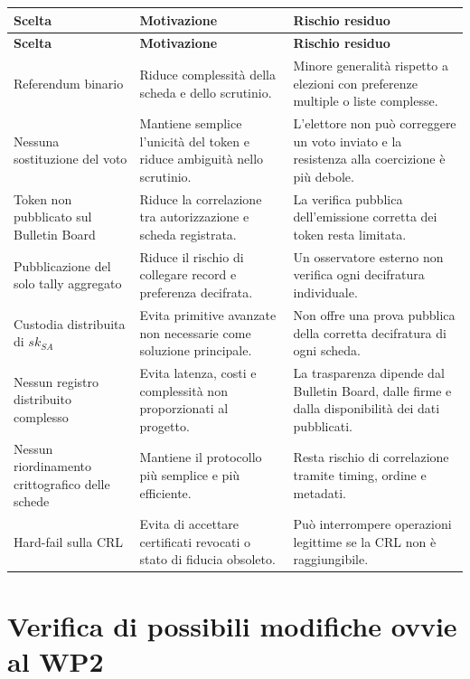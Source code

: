 \documentclass[a4paper,12pt]{article}
\begin{document}
\begin{longtable}{|>{\raggedright\arraybackslash}p{}|>{\raggedright\arraybackslash}p{}|>{\raggedright\arraybackslash}p{}|}
    \hline
    \rowcolor{HeaderBlue}\textbf{Scelta} & \textbf{Motivazione} & \textbf{Rischio residuo} \\
    \hline
    \endfirsthead
    \hline
    \rowcolor{HeaderBlue}\textbf{Scelta} & \textbf{Motivazione} & \textbf{Rischio residuo} \\
    \hline
    \endhead
    Referendum binario & Riduce complessità della scheda e dello scrutinio. & Minore generalità rispetto a elezioni con preferenze multiple o liste complesse. \\
    \hline
    Nessuna sostituzione del voto & Mantiene semplice l'unicità del token e riduce ambiguità nello scrutinio. & L'elettore non può correggere un voto inviato e la resistenza alla coercizione è più debole. \\
    \hline
    Token non pubblicato sul Bulletin Board & Riduce la correlazione tra autorizzazione e scheda registrata. & La verifica pubblica dell'emissione corretta dei token resta limitata. \\
    \hline
    Pubblicazione del solo tally aggregato & Riduce il rischio di collegare record e preferenza decifrata. & Un osservatore esterno non verifica ogni decifratura individuale. \\
    \hline
    Custodia distribuita di \(sk_{SA}\) & Evita primitive avanzate non necessarie come soluzione principale. & Non offre una prova pubblica della corretta decifratura di ogni scheda. \\
    \hline
    Nessun registro distribuito complesso & Evita latenza, costi e complessità non proporzionati al progetto. & La trasparenza dipende dal Bulletin Board, dalle firme e dalla disponibilità dei dati pubblicati. \\
    \hline
    Nessun riordinamento crittografico delle schede & Mantiene il protocollo più semplice e più efficiente. & Resta rischio di correlazione tramite timing, ordine e metadati. \\
    \hline
    Hard-fail sulla CRL & Evita di accettare certificati revocati o stato di fiducia obsoleto. & Può interrompere operazioni legittime se la CRL non è raggiungibile. \\
    \hline
\end{longtable}

\section{Verifica di possibili modifiche ovvie al WP2}
\end{document}
